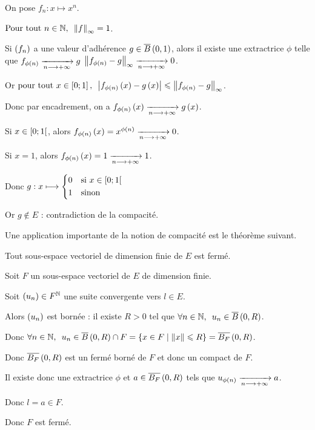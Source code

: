 \begin{dem}
On pose \(f_n:x\mapsto x^n\).

\(\quantifs{\Tpt n\in\N}\norme{f}_\infty=1\).

Si \(\left(f_n\right)\) a une valeur d'adhérence \(g\in\boulef{0}{1}\), alors il existe une extractrice \(\phi\) telle que \(f_{\phi\left(n\right)}\xrightarrow[n\longrightarrow+\infty]{}g\) \ie \(\norme{f_{\phi\paren{n}}-g}_\infty\tendqd{n\to\pinf}0\).

Or \(\quantifs{\tpt x\in\intervii{0}{1}}\abs{f_{\phi\paren{n}}\paren{x}-g\paren{x}}\leq\norme{f_{\phi\paren{n}}-g}_\infty\).

Donc par encadrement, on a \(f_{\phi\left(n\right)}\left(x\right)\xrightarrow[n\longrightarrow+\infty]{}g\left(x\right)\).

Si \(x\in\left[0;1\right[\), alors \(f_{\phi\left(n\right)}\left(x\right)=x^{\phi\left(n\right)}\xrightarrow[n\longrightarrow+\infty]{}0\).

Si \(x=1\), alors \(f_{\phi\left(n\right)}\left(x\right)=1\xrightarrow[n\longrightarrow+\infty]{}1\).

Donc \(g:x\longmapsto\begin{dcases}
0 &\text{si }x\in\left[0;1\right[ \\
1 &\text{sinon}
\end{dcases}\)

Or \(g\not\in E\) : contradiction de la compacité.
\end{dem}

Une application importante de la notion de compacité est le théorème suivant.

\begin{theo}
Tout sous-espace vectoriel de dimension finie de \(E\) est fermé.
\end{theo}

\begin{dem}
Soit \(F\) un sous-espace vectoriel de \(E\) de dimension finie.

Soit \(\left(u_n\right)\in F^{\mathbb{N}}\) une suite convergente vers \(l\in E\).

Alors \(\left(u_n\right)\) est bornée : il existe \(R>0\) tel que \(\quantifs{\forall n\in\N}u_n\in\boulef{0}{R}\).

Donc \(\quantifs{\forall n\in\N}u_n\in\boulef{0}{R}\inter F=\accol{x\in F\tq\norme{x}\leq R}=\boulef[F]{0}{R}\).

Donc \(\boulef[F]{0}{R}\) est un fermé borné de \(F\) et donc un compact de \(F\).

Il existe donc une extractrice \(\phi\) et \(a\in\boulef[F]{0}{R}\) tels que \(u_{\phi\left(n\right)}\xrightarrow[n\longrightarrow+\infty]{}a\).

Donc \(l=a\in F\).

Donc \(F\) est fermé.
\end{dem}

